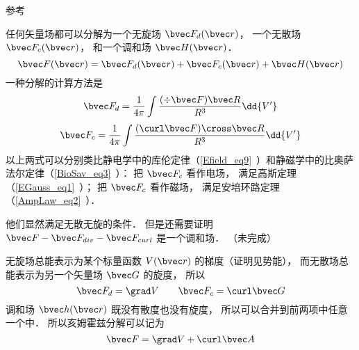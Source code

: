 
\begin{issues}
\issueDraft
\end{issues}

参考 \cite{GriffE}

任何矢量场都可以分解为一个无旋场 $\bvec F_{d}(\bvec r)$， 一个无散场 $\bvec F_{c}(\bvec r)$， 和一个调和场 $\bvec H(\bvec r)$．%
\begin{equation}
\bvec F(\bvec r) = \bvec F_{d}(\bvec r) + \bvec F_{c}(\bvec r) + \bvec H(\bvec r)
\end{equation}
一种分解的计算方法是
\begin{equation}\label{HelmTh_eq1}
\bvec F_{d} = \frac{1}{4\pi}\int \frac{(\div \bvec F)\bvec R}{R^3} \dd{V'}
\end{equation}
\begin{equation}
\bvec F_{c} = \frac{1}{4\pi}\int \frac{(\curl \bvec F)\cross \bvec R}{R^3} \dd{V'}
\end{equation}
以上两式可以分别类比静电学中的库伦定律（\autoref{Efield_eq9}~）和静磁学中的比奥萨法尔定律（\autoref{BioSav_eq3}~）： 把 $\bvec F_c$ 看作电场， 满足高斯定理（\autoref{EGauss_eq1}~）； 把 $\bvec F_c$ 看作磁场， 满足安培环路定理（\autoref{AmpLaw_eq2}~）．

他们显然满足无散无旋的条件． 但是还需要证明 $\bvec F - \bvec F_{div} - \bvec F_{curl}$ 是一个调和场．
（未完成）

无旋场总能表示为某个标量函数 $V(\bvec r)$ 的梯度（证明见势能）， 而无散场总能表示为另一个矢量场 $\bvec G$ 的旋度， 所以
\begin{equation}
\bvec F_{d} = \grad V\qquad \bvec F_{c} = \curl \bvec G
\end{equation}
调和场 $\bvec h(\bvec r)$ 既没有散度也没有旋度， 所以可以合并到前两项中任意一个中． 所以亥姆霍兹分解可以记为
\begin{equation}
\bvec F = \grad V + \curl \bvec A
\end{equation}


